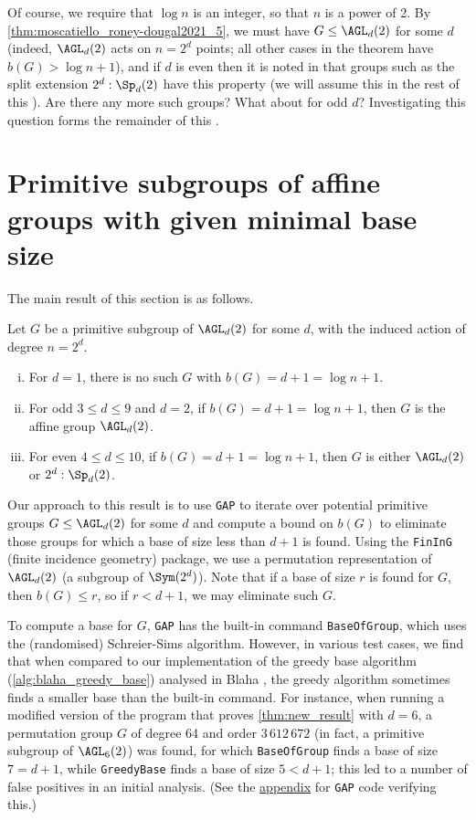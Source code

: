 Of course, we require that $\log n$ is an integer, so that $n$ is a power of 2. By \autoref{thm:moscatiello_roney-dougal2021_5}, we must have $G \leq \AGL_d(2)$ for some $d$ (indeed, $\AGL_d(2)$ acts on $n = 2^d$ points; all other cases in the theorem have $b(G) > \log n + 1$), and if $d$ is even then it is noted in \cite{moscatiello_roney-dougal2021} that groups such as the split extension $2^d : \Sp_d(2)$ have this property (we will assume this in the rest of this \thesis{}). Are there any more such groups? What about for odd $d$? Investigating this question forms the remainder of this \thesis{}.

\section{Primitive subgroups of affine groups with given minimal base size}

The main result of this section is as follows.

\begin{theorem}\label{thm:new_result}
    Let $G$ be a primitive subgroup of $\AGL_d(2)$ for some $d$, with the induced action of degree $n = 2^d$.
    \begin{enumerate}[(i)]
        \item For $d = 1$, there is no such $G$ with $b(G) = d + 1 = \log n + 1$.
        \item For odd $3 \leq d \leq 9$ and $d = 2$, if $b(G) = d + 1 = \log n + 1$, then $G$ is the affine group $\AGL_d(2)$.
        \item For even $4 \leq d \leq 10$, if $b(G) = d + 1 = \log n + 1$, then $G$ is either $\AGL_d(2)$ or $2^d : \Sp_d(2)$.
    \end{enumerate}
\end{theorem}

Our approach to this result is to use \texttt{GAP} to iterate over potential primitive groups $G \leq \AGL_d(2)$ for some $d$ and compute a bound on $b(G)$ to eliminate those groups for which a base of size less than $d + 1$ is found. Using the \texttt{FinInG} (finite incidence geometry) package, we use a permutation representation of $\AGL_d(2)$ (a subgroup of $\Sym(2^d)$). Note that if a base of size $r$ is found for $G$, then $b(G) \leq r$, so if $r < d + 1$, we may eliminate such $G$.

To compute a base for $G$, \texttt{GAP} has the built-in command \texttt{BaseOfGroup}, which uses the (randomised) Schreier-Sims algorithm. However, in various test cases, we find that when compared to our implementation of the greedy base algorithm (\autoref{alg:blaha_greedy_base}) analysed in Blaha \cite{blaha1992}, the greedy algorithm sometimes finds a smaller base than the built-in command. For instance, when running a modified version of the program that proves \autoref{thm:new_result} with $d = 6$, a permutation group $G$ of degree 64 and order $3\,612\,672$ (in fact, a primitive subgroup of $\AGL_6(2)$) was found, for which \texttt{BaseOfGroup} finds a base of size $7 = d + 1$, while \texttt{GreedyBase} finds a base of size $5 < d + 1$; this led to a number of false positives in an initial analysis. (See the \hyperref[app:greedy_better_than_default]{appendix} for \texttt{GAP} code verifying this.)

